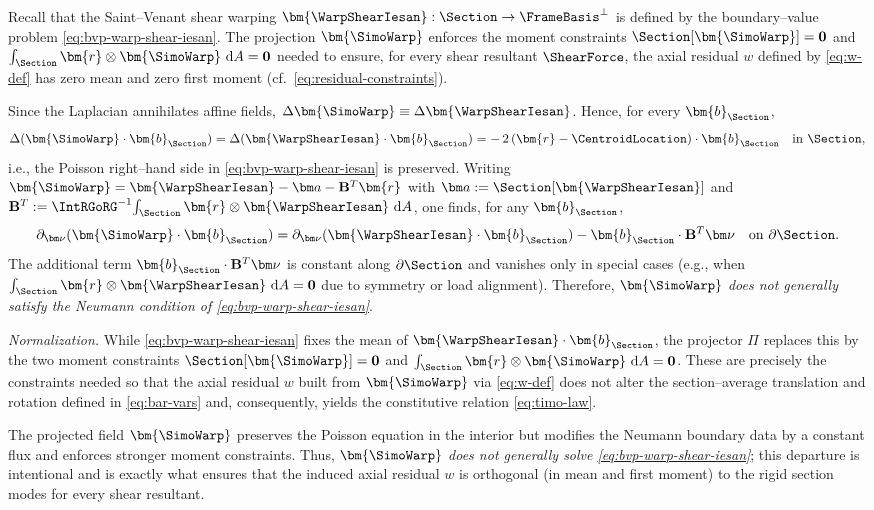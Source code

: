 \begin{remark}
Recall that the Saint–Venant shear warping $\bm{\WarpShearIesan}:\Section\to\FrameBasis^\perp$ is defined by the boundary–value problem \eqref{eq:bvp-warp-shear-iesan}. 
The projection \(\bm{\SimoWarp}\) enforces the moment constraints $\Section[\bm{\SimoWarp}]=\mathbf{0}$ and $\int_{\Section}\bm{r}\otimes\bm{\SimoWarp}\mathrm{~d}A=\mathbf{0}$ needed to ensure, for every shear resultant $\ShearForce$, the axial residual $w$ defined by \eqref{eq:w-def} has zero mean and zero first moment (cf.\ \eqref{eq:residual-constraints}).

Since the Laplacian annihilates affine fields, $\Delta\bm{\SimoWarp} \equiv \Delta\bm{\WarpShearIesan}$. 
Hence, for every $\bm{b}_{\Section}$,
\[
\Delta(\bm{\SimoWarp}\cdot\bm{b}_{\Section})=\Delta(\bm{\WarpShearIesan}\cdot\bm{b}_{\Section})
=-\,2\,(\bm{r}-\CentroidLocation)\cdot\bm{b}_{\Section}
\quad\text{in }\Section,
\]
i.e., the Poisson right–hand side in \eqref{eq:bvp-warp-shear-iesan} is preserved. 
Writing $\bm{\SimoWarp}=\bm{\WarpShearIesan}-\bm a-\mathbf B^{T}\bm{r}$ with 
$\bm a:=\Section[\bm{\WarpShearIesan}]$ and 
$\mathbf B^{T}:=\IntRGoRG^{-1}\!\int_{\Section}\bm{r}\otimes\bm{\WarpShearIesan}\mathrm{~d}A$, one finds, for any $\bm{b}_{\Section}$,
\[
\partial_{\bm\nu}(\bm{\SimoWarp}\cdot\bm{b}_{\Section})
=\partial_{\bm\nu}(\bm{\WarpShearIesan}\cdot\bm{b}_{\Section})
-\bm{b}_{\Section}\cdot\mathbf B^{T}\bm\nu
\quad\text{on }\partial\Section.
\]
The additional term $\bm{b}_{\Section}\cdot\mathbf B^{T}\bm\nu$ is constant along $\partial\Section$ and vanishes only in special cases (e.g., when $\int_{\Section}\bm{r}\otimes\bm{\WarpShearIesan}\mathrm{~d}A=\mathbf{0}$ due to symmetry or load alignment). 
Therefore, \emph{$\bm{\SimoWarp}$ does not generally satisfy the Neumann condition of \eqref{eq:bvp-warp-shear-iesan}}.

\emph{Normalization.} While \eqref{eq:bvp-warp-shear-iesan} fixes the mean of $\bm{\WarpShearIesan}\cdot\bm{b}_{\Section}$, the projector $\Pi$ replaces this by the two moment constraints $\Section[\bm{\SimoWarp}]=\mathbf{0}$ and $\int_{\Section}\bm{r}\otimes\bm{\SimoWarp}\mathrm{~d}A=\mathbf{0}$. 
These are precisely the constraints needed so that the axial residual $w$ built from $\bm{\SimoWarp}$ via \eqref{eq:w-def} does not alter the section–average translation and rotation defined in \eqref{eq:bar-vars} and, consequently, yields the constitutive relation \eqref{eq:timo-law}.

The projected field $\bm{\SimoWarp}$ preserves the Poisson equation in the interior but modifies the Neumann boundary data by a constant flux and enforces stronger moment constraints. 
Thus, \emph{$\bm{\SimoWarp}$ does not generally solve \eqref{eq:bvp-warp-shear-iesan}}; this departure is intentional and is exactly what ensures that the induced axial residual $w$ is orthogonal (in mean and first moment) to the rigid section modes for every shear resultant.

\end{remark}



